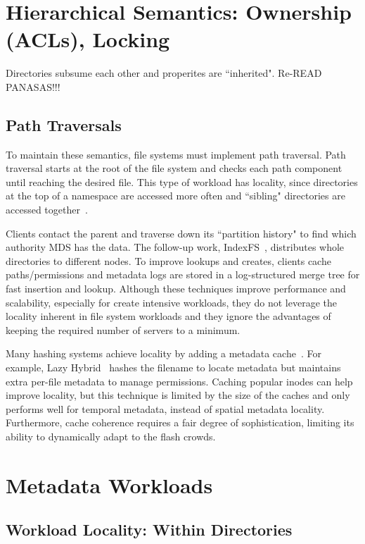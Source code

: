 \section{Hierarchical Semantics: Ownership (ACLs), Locking}

Directories subsume each other and properites are ``inherited". Re-READ PANASAS!!!

\subsection{Path Traversals}

To maintain these semantics, file systems must implement path traversal. Path
traversal starts at the root of the file system and checks each path component
until reaching the desired file. This type of workload has locality, since
directories at the top of a namespace are accessed more often and ``sibling"
directories are accessed together~\cite{indexFS}. 

Clients contact the parent and traverse down its ``partition history" to find
which authority MDS has the data. The follow-up work,
IndexFS~\cite{patil:fast2011-giga+}, distributes whole directories to different
nodes. To improve lookups and creates, clients cache paths/permissions and
metadata logs are stored in a log-structured merge tree for fast insertion and
lookup.  Although these techniques improve performance and scalability,
especially for create intensive workloads, they do not leverage the locality
inherent in file system workloads and they ignore the advantages of keeping the
required number of servers to a minimum. 

Many hashing systems achieve locality by adding a metadata
cache~\cite{li:msst2006-dynamic, xing:sc2009-skyfs,zhu:pds2008-hba}. For
example, Lazy Hybrid~\cite{brandt:mss2003-lh} hashes the filename to locate
metadata but maintains extra per-file metadata to manage permissions. Caching
popular inodes can help improve locality, but this technique is limited by the
size of the caches and only performs well for temporal metadata, instead of
spatial metadata locality. Furthermore, cache coherence requires a fair degree
of sophistication, limiting its ability to dynamically adapt to the flash
crowds.

\section{Metadata Workloads}
\subsection{Workload Locality: Within Directories}

